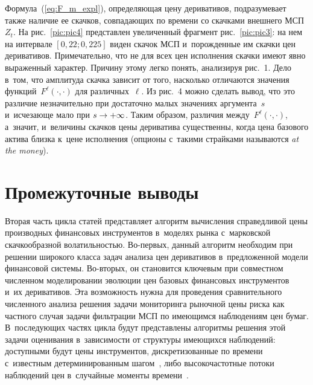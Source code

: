 \begin{multicols}{2}
Формула~(\ref{eq:F_m_expl}), определяющая цену деривативов, подразумевает также наличие ее скачков, 
совпадающих по времени со скачками внеш\-не\-го МСП~$Z_t$. 
На рис.~\ref{pic:pic4} пред\-став\-лен увеличенный фрагмент рис.~\ref{pic:pic3}: на нем на интервале $[0{,}22; 0{,}225]$ виден скачок МСП 
и~по\-рож\-ден\-ные им скачки цен деривативов. Примечательно, что не для всех цен исполнения скач\-ки имеют явно выраженный характер. 
Причину этому легко понять, анализируя рис.~1. Дело в~том, что амплитуда скач\-ка зависит от того, насколько отличаются значения 
функций~$F^{\ell}(\cdot,\cdot)$ для различных~$\ell$. Из рис.~4 можно сделать вывод, что это различие 
незначительно при достаточно малых значениях аргумента~$s$ 
и~исче\-за\-юще мало при $s \hm\to +\infty$. Таким образом, различия между~$F^{\ell}(\cdot,\cdot)$, 
а~значит, и~величины скачков цены дериватива 
существенны, когда цена базового актива близ\-ка к~цене исполнения (опционы с~такими страйками называются \textit{at the money}).

\vspace*{-6pt}

\section{Промежуточные выводы}

\vspace*{-3pt}

Вторая часть цикла статей пред\-став\-ля\-ет алгоритм вы\-чис\-ле\-ния справедливой цены  производных финансовых инструментов в~моделях рынка с~марковской 
скачкообразной во\-ла\-тиль\-ностью. Во-пер\-вых, данный алгоритм необходим при решении широкого класса задач анализа цен деривативов в~предложенной 
модели финансовой сис\-те\-мы. Во-вто\-рых, он становится ключевым при совместном чис\-лен\-ном моделировании эволюции цен базовых финансовых инструментов и~их 
деривативов. Эта воз\-мож\-ность нуж\-на для проведения сравнительного чис\-лен\-но\-го анализа решения задачи мониторинга рыночной цены рис\-ка как 
част\-но\-го случая задачи фильт\-ра\-ции МСП по име\-ющим\-ся наблюдениям цен бумаг. 
В~по\-сле\-ду\-ющих час\-тях цик\-ла будут пред\-став\-ле\-ны алгоритмы решения этой задачи оценивания в~за\-ви\-си\-мости от структуры име\-ющих\-ся наблюдений: 
до\-ступ\-ны\-ми будут цены инструментов, дискретизованные по времени с~известным детерминированным шагом~\cite{B_20_2_IA, B_20_3_IA},
 либо вы\-со\-ко\-час\-тот\-ные потоки наблюдений цен в~случайные моменты времени~\cite{B_20_3_ARC}.


\end{multicols}
